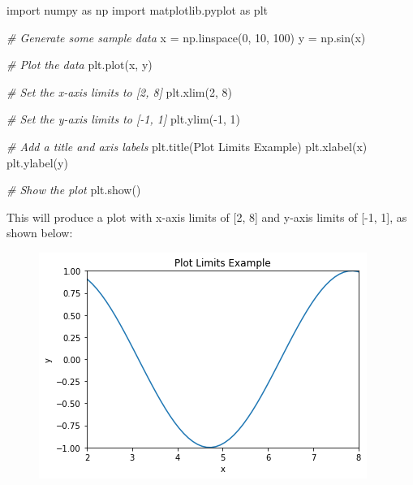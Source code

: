 \documentclass[11pt]{article}
\newenvironment{Shaded}{}{}
\newcommand{\DecValTok}[1]{\textcolor[rgb]{0.25,0.63,0.44}{{#1}}}
\newcommand{\StringTok}[1]{\textcolor[rgb]{0.25,0.44,0.63}{{#1}}}
\newcommand{\CommentTok}[1]{\textcolor[rgb]{0.38,0.63,0.69}{\textit{{#1}}}}
\newcommand{\NormalTok}[1]{{#1}}
\newcommand{\ImportTok}[1]{{#1}}
\newcommand{\OperatorTok}[1]{\textcolor[rgb]{0.40,0.40,0.40}{{#1}}}
\begin{document}
\begin{Shaded}
\begin{Highlighting}[]
\ImportTok{import}\NormalTok{ numpy }\ImportTok{as}\NormalTok{ np}
\ImportTok{import}\NormalTok{ matplotlib.pyplot }\ImportTok{as}\NormalTok{ plt}

\CommentTok{\# Generate some sample data}
\NormalTok{x }\OperatorTok{=}\NormalTok{ np.linspace(}\DecValTok{0}\NormalTok{, }\DecValTok{10}\NormalTok{, }\DecValTok{100}\NormalTok{)}
\NormalTok{y }\OperatorTok{=}\NormalTok{ np.sin(x)}

\CommentTok{\# Plot the data}
\NormalTok{plt.plot(x, y)}

\CommentTok{\# Set the x{-}axis limits to [2, 8]}
\NormalTok{plt.xlim(}\DecValTok{2}\NormalTok{, }\DecValTok{8}\NormalTok{)}

\CommentTok{\# Set the y{-}axis limits to [{-}1, 1]}
\NormalTok{plt.ylim(}\OperatorTok{{-}}\DecValTok{1}\NormalTok{, }\DecValTok{1}\NormalTok{)}

\CommentTok{\# Add a title and axis labels}
\NormalTok{plt.title(}\StringTok{\textquotesingle{}Plot Limits Example\textquotesingle{}}\NormalTok{)}
\NormalTok{plt.xlabel(}\StringTok{\textquotesingle{}x\textquotesingle{}}\NormalTok{)}
\NormalTok{plt.ylabel(}\StringTok{\textquotesingle{}y\textquotesingle{}}\NormalTok{)}

\CommentTok{\# Show the plot}
\NormalTok{plt.show()}
\end{Highlighting}
\end{Shaded}

This will produce a plot with x-axis limits of {[}2, 8{]} and y-axis
limits of {[}-1, 1{]}, as shown below: 
\begin{figure}
  \centering
  \includegraphics[scale=0.6]{plot_lim.png}
\end{figure}
\end{document}
